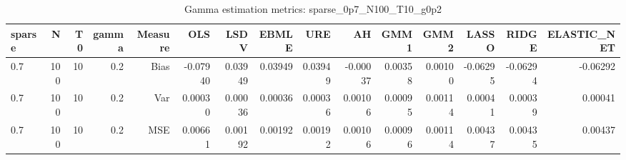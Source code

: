 \begin{table}[!htbp]\centering
\caption{Gamma estimation metrics: sparse_0p7_N100_T10_g0p2}
\label{tab:table1_sparse_0p7_N100_T10_g0p2}
\begin{tabular}{lrrrrrrrrrrrrrr}
\hline
sparse & N & T0 & gamma & Measure & OLS & LSDV & EBMLE & URE & AH & GMM1 & GMM2 & LASSO & RIDGE & ELASTIC_NET \\
\hline
0.7 & 100 & 10 & 0.2 & Bias & -0.07940 & 0.03949 & 0.03949 & 0.03949 & -0.00037 & 0.00358 & 0.00100 & -0.06295 & -0.06294 & -0.06292 \\
0.7 & 100 & 10 & 0.2 & Var & 0.00030 & 0.00036 & 0.00036 & 0.00036 & 0.00106 & 0.00095 & 0.00114 & 0.00041 & 0.00039 & 0.00041 \\
0.7 & 100 & 10 & 0.2 & MSE & 0.00661 & 0.00192 & 0.00192 & 0.00192 & 0.00106 & 0.00096 & 0.00114 & 0.00437 & 0.00435 & 0.00437 \\
\hline
\end{tabular}
\end{table}

